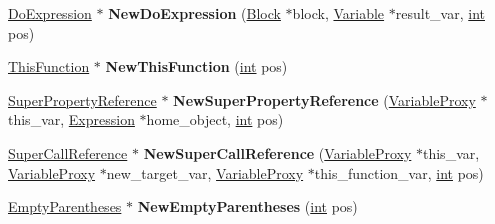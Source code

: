 \begin{DoxyCompactItemize}
\item 
\mbox{\label{classv8_1_1internal_1_1AstNodeFactory_a506660af44e00f20507ca20a7a338ee3}} 
\mbox{\hyperlink{classv8_1_1internal_1_1DoExpression}{Do\+Expression}} $\ast$ {\bfseries New\+Do\+Expression} (\mbox{\hyperlink{classv8_1_1internal_1_1Block}{Block}} $\ast$block, \mbox{\hyperlink{classv8_1_1internal_1_1Variable}{Variable}} $\ast$result\+\_\+var, \mbox{\hyperlink{classint}{int}} pos)
\item 
\mbox{\label{classv8_1_1internal_1_1AstNodeFactory_a0455b1e946248fcc3a7f3abb590e66d9}} 
\mbox{\hyperlink{classv8_1_1internal_1_1ThisFunction}{This\+Function}} $\ast$ {\bfseries New\+This\+Function} (\mbox{\hyperlink{classint}{int}} pos)
\item 
\mbox{\label{classv8_1_1internal_1_1AstNodeFactory_a6ee3d5f116c30e54e50bc3fb9033b9aa}} 
\mbox{\hyperlink{classv8_1_1internal_1_1SuperPropertyReference}{Super\+Property\+Reference}} $\ast$ {\bfseries New\+Super\+Property\+Reference} (\mbox{\hyperlink{classv8_1_1internal_1_1VariableProxy}{Variable\+Proxy}} $\ast$this\+\_\+var, \mbox{\hyperlink{classv8_1_1internal_1_1Expression}{Expression}} $\ast$home\+\_\+object, \mbox{\hyperlink{classint}{int}} pos)
\item 
\mbox{\label{classv8_1_1internal_1_1AstNodeFactory_a2911dbdb3b0091f493568c8445f3a457}} 
\mbox{\hyperlink{classv8_1_1internal_1_1SuperCallReference}{Super\+Call\+Reference}} $\ast$ {\bfseries New\+Super\+Call\+Reference} (\mbox{\hyperlink{classv8_1_1internal_1_1VariableProxy}{Variable\+Proxy}} $\ast$this\+\_\+var, \mbox{\hyperlink{classv8_1_1internal_1_1VariableProxy}{Variable\+Proxy}} $\ast$new\+\_\+target\+\_\+var, \mbox{\hyperlink{classv8_1_1internal_1_1VariableProxy}{Variable\+Proxy}} $\ast$this\+\_\+function\+\_\+var, \mbox{\hyperlink{classint}{int}} pos)
\item 
\mbox{\label{classv8_1_1internal_1_1AstNodeFactory_a06c3b38be3cb9a03de50ea7f36e47fa8}} 
\mbox{\hyperlink{classv8_1_1internal_1_1EmptyParentheses}{Empty\+Parentheses}} $\ast$ {\bfseries New\+Empty\+Parentheses} (\mbox{\hyperlink{classint}{int}} pos)
\item 

\end{DoxyCompactItemize}
